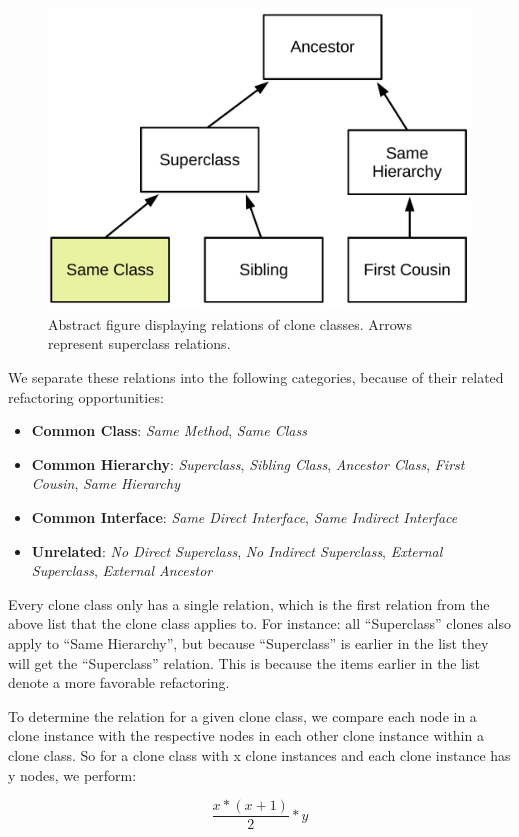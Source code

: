 \begin{figure}[H]
  \centering
    \includegraphics[width=0.6\columnwidth]{img/Relation}
      \caption{Abstract figure displaying relations of clone classes. Arrows represent superclass relations.}
  \label{fig:clonerelation}
\end{figure}

We separate these relations into the following categories, because of their related refactoring opportunities:
\begin{itemize}
  \item \textbf{Common Class}: \textit{Same Method}, \textit{Same Class}
  \item \textbf{Common Hierarchy}: \textit{Superclass}, \textit{Sibling Class}, \textit{Ancestor Class}, \textit{First Cousin}, \textit{Same Hierarchy}
  \item \textbf{Common Interface}: \textit{Same Direct Interface}, \textit{Same Indirect Interface}
  \item \textbf{Unrelated}: \textit{No Direct Superclass}, \textit{No Indirect Superclass}, \textit{External Superclass}, \textit{External Ancestor}
\end{itemize}

Every clone class only has a single relation, which is the first relation from the above list that the clone class applies to. For instance: all ``Superclass'' clones also apply to ``Same Hierarchy'', but because ``Superclass'' is earlier in the list they will get the ``Superclass'' relation. This is because the items earlier in the list denote a more favorable refactoring.

To determine the relation for a given clone class, we compare each node in a clone instance with the respective nodes in each other clone instance within a clone class. So for a clone class with x clone instances and each clone instance has y nodes, we perform:

\begin{equation}\label{eq:sameclass}
\frac{x * (x + 1)}{2} * y
\end{equation}

